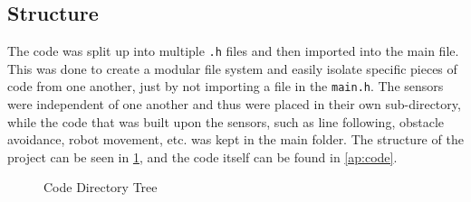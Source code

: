 \documentclass[11pt]{report}
\begin{document}
\subsection{Structure}

The code was split up into multiple \texttt{.h} files and then imported into the main file. This was done to create a modular file system and easily isolate specific pieces of code from one another, just by not importing a file in the \texttt{main.h}. The sensors were independent of one another and thus were placed in their own sub-directory, while the code that was built upon the sensors, such as line following, obstacle avoidance, robot movement, etc. was kept in the main folder. The structure of the project can be seen in \cref{fig:code-directory-tree}, and the code itself can be found in \cref{ap:code}.

\begin{figure}
    \centering
    \begin{minipage}{0.4\textwidth}
    \end{minipage}
    \caption{Code Directory Tree}
    \label{fig:code-directory-tree}
\end{figure}
\end{document}
